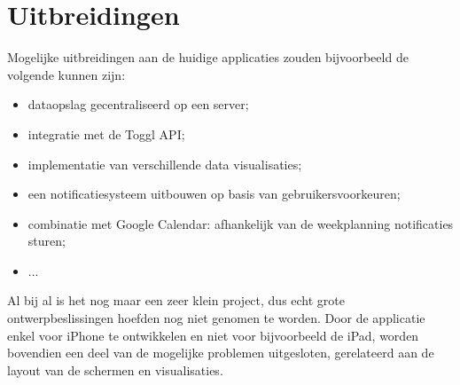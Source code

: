 


\section{Uitbreidingen}\label{section:uibreidingen}

Mogelijke uitbreidingen aan de huidige applicaties zouden bijvoorbeeld de volgende kunnen zijn:

\begin{itemize}
	\item dataopslag gecentraliseerd op een server;
	\item	integratie met de Toggl API;
	\item	implementatie van verschillende data visualisaties;
	\item een notificatiesysteem uitbouwen op basis van gebruikersvoorkeuren;
	\item	combinatie met Google Calendar: afhankelijk van de weekplanning notificaties sturen;
	\item	...
\end{itemize}

Al bij al is het nog maar een zeer klein project, dus echt grote ontwerpbeslissingen hoefden nog niet genomen te worden. Door de applicatie enkel voor iPhone te ontwikkelen en niet voor bijvoorbeeld de iPad, worden bovendien een deel van de mogelijke problemen uitgesloten, gerelateerd aan de layout van de schermen en visualisaties.










